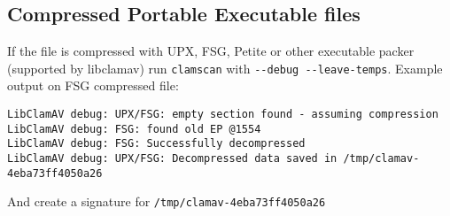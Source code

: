 \documentclass[a4paper,titlepage,12pt]{article}
\begin{document}
    \subsection{Compressed Portable Executable files}
    If the file is compressed with UPX, FSG, Petite or other executable packer
    (supported by libclamav) run \verb+clamscan+ with
    \verb+--debug --leave-temps+. Example output on FSG compressed file:
    \begin{verbatim}
LibClamAV debug: UPX/FSG: empty section found - assuming compression
LibClamAV debug: FSG: found old EP @1554
LibClamAV debug: FSG: Successfully decompressed
LibClamAV debug: UPX/FSG: Decompressed data saved in /tmp/clamav-4eba73ff4050a26
    \end{verbatim}
    And create a signature for \verb+/tmp/clamav-4eba73ff4050a26+
\end{document}
